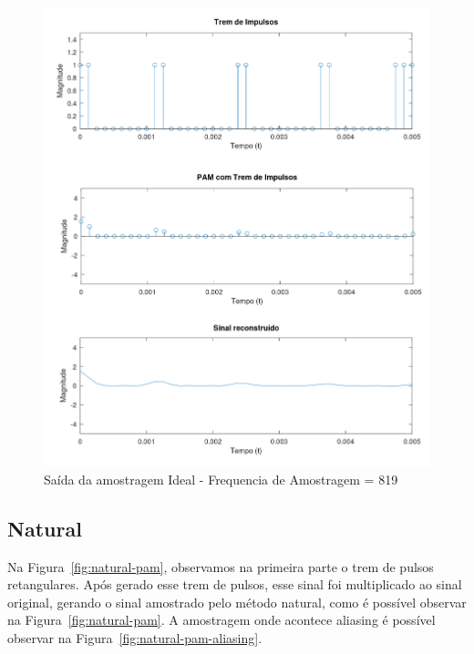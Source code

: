 \begin{figure}[H]
    \centering
    \includegraphics[width=0.8\linewidth]{03_results/octave_results/ideal_aliasing_sampling.png}
    \caption{Saída da amostragem Ideal - Frequencia de Amostragem = 819}
    \label{fig:ideal-pam-aliasing}
\end{figure}

\subsection{Natural}

Na Figura~\ref{fig:natural-pam}, observamos na primeira parte o trem de pulsos retangulares. Após gerado esse trem de pulsos, esse sinal foi multiplicado ao sinal original, gerando o sinal amostrado pelo método natural, como é possível observar na Figura~\ref{fig:natural-pam}. A amostragem onde acontece aliasing é possível observar na Figura~\ref{fig:natural-pam-aliasing}.

